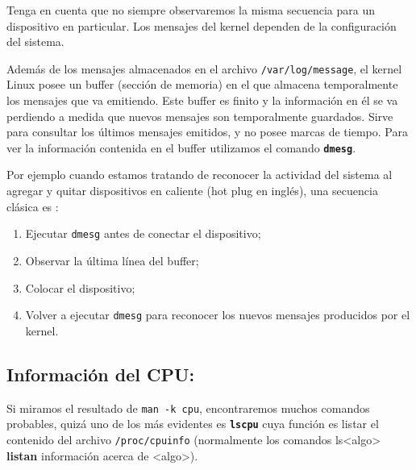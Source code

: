 \documentclass[12pt]{article}
\begin{document}
Tenga en cuenta que no siempre observaremos la misma secuencia para un dispositivo en particular. 
Los mensajes del kernel dependen de la configuración del sistema.


Además de los mensajes almacenados en el archivo \texttt{/var/log/message}, el kernel Linux posee un buffer 
(sección de memoria) en el que almacena temporalmente los mensajes que va emitiendo. Este buffer es 
finito y la información en él se va perdiendo a medida que nuevos mensajes son temporalmente guardados. Sirve para 
consultar los últimos mensajes emitidos, y no posee marcas de tiempo. Para ver la información contenida en el 
buffer utilizamos el comando \texttt{\textbf{dmesg}}. 

Por ejemplo cuando estamos tratando de reconocer la actividad del sistema al agregar y quitar 
dispositivos en caliente (hot plug en inglés), una secuencia clásica es :

\begin{enumerate}
	\item Ejecutar \texttt{dmesg} antes de conectar el dispositivo;
	\item Observar la última línea del buffer;
	\item Colocar el dispositivo;
	\item Volver a ejecutar \texttt{dmesg} para reconocer los nuevos mensajes producidos por el kernel.
\end{enumerate}


\subsection*{Información del CPU:}

Si miramos el resultado de \texttt{man -k cpu}, encontraremos muchos comandos probables, quizá 
uno de los más evidentes es \textbf{\texttt{lscpu}} cuya función es listar el contenido del archivo 
\texttt{/proc/cpuinfo} (normalmente los comandos ls{\textless}algo\textgreater  
\textbf{listan} información acerca de {\textless}algo\textgreater).
\end{document}
